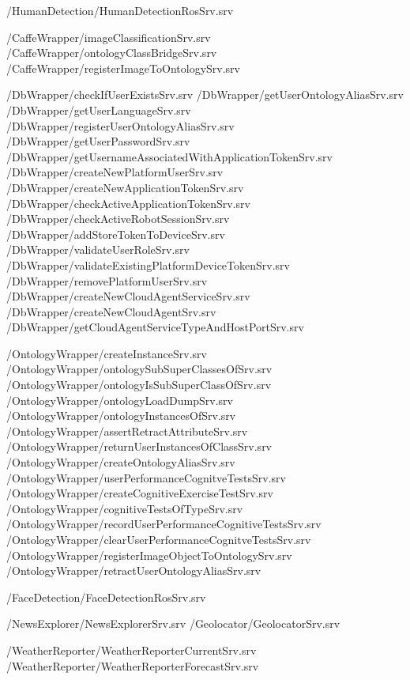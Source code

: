 /\-Human\-Detection/\-Human\-Detection\-Ros\-Srv.srv

/\-Caffe\-Wrapper/image\-Classification\-Srv.srv /\-Caffe\-Wrapper/ontology\-Class\-Bridge\-Srv.srv /\-Caffe\-Wrapper/register\-Image\-To\-Ontology\-Srv.srv

/\-Db\-Wrapper/check\-If\-User\-Exists\-Srv.srv /\-Db\-Wrapper/get\-User\-Ontology\-Alias\-Srv.srv /\-Db\-Wrapper/get\-User\-Language\-Srv.srv /\-Db\-Wrapper/register\-User\-Ontology\-Alias\-Srv.srv /\-Db\-Wrapper/get\-User\-Password\-Srv.srv /\-Db\-Wrapper/get\-Username\-Associated\-With\-Application\-Token\-Srv.srv /\-Db\-Wrapper/create\-New\-Platform\-User\-Srv.srv /\-Db\-Wrapper/create\-New\-Application\-Token\-Srv.srv /\-Db\-Wrapper/check\-Active\-Application\-Token\-Srv.srv /\-Db\-Wrapper/check\-Active\-Robot\-Session\-Srv.srv /\-Db\-Wrapper/add\-Store\-Token\-To\-Device\-Srv.srv /\-Db\-Wrapper/validate\-User\-Role\-Srv.srv /\-Db\-Wrapper/validate\-Existing\-Platform\-Device\-Token\-Srv.srv /\-Db\-Wrapper/remove\-Platform\-User\-Srv.srv /\-Db\-Wrapper/create\-New\-Cloud\-Agent\-Service\-Srv.srv /\-Db\-Wrapper/create\-New\-Cloud\-Agent\-Srv.srv /\-Db\-Wrapper/get\-Cloud\-Agent\-Service\-Type\-And\-Host\-Port\-Srv.srv

/\-Ontology\-Wrapper/create\-Instance\-Srv.srv /\-Ontology\-Wrapper/ontology\-Sub\-Super\-Classes\-Of\-Srv.srv /\-Ontology\-Wrapper/ontology\-Is\-Sub\-Super\-Class\-Of\-Srv.srv /\-Ontology\-Wrapper/ontology\-Load\-Dump\-Srv.srv /\-Ontology\-Wrapper/ontology\-Instances\-Of\-Srv.srv /\-Ontology\-Wrapper/assert\-Retract\-Attribute\-Srv.srv /\-Ontology\-Wrapper/return\-User\-Instances\-Of\-Class\-Srv.srv /\-Ontology\-Wrapper/create\-Ontology\-Alias\-Srv.srv /\-Ontology\-Wrapper/user\-Performance\-Cognitve\-Tests\-Srv.srv /\-Ontology\-Wrapper/create\-Cognitive\-Exercise\-Test\-Srv.srv /\-Ontology\-Wrapper/cognitive\-Tests\-Of\-Type\-Srv.srv /\-Ontology\-Wrapper/record\-User\-Performance\-Cognitive\-Tests\-Srv.srv /\-Ontology\-Wrapper/clear\-User\-Performance\-Cognitve\-Tests\-Srv.srv /\-Ontology\-Wrapper/register\-Image\-Object\-To\-Ontology\-Srv.srv /\-Ontology\-Wrapper/retract\-User\-Ontology\-Alias\-Srv.srv

/\-Face\-Detection/\-Face\-Detection\-Ros\-Srv.srv

/\-News\-Explorer/\-News\-Explorer\-Srv.srv /\-Geolocator/\-Geolocator\-Srv.srv

/\-Weather\-Reporter/\-Weather\-Reporter\-Current\-Srv.srv /\-Weather\-Reporter/\-Weather\-Reporter\-Forecast\-Srv.srv

